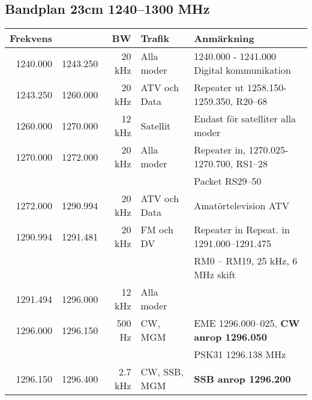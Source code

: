 \begin{landscape}
\subsection{Bandplan 23cm 1240--1300 MHz}
\begin{tabular}{rrrll}
	\textbf{Frekvens}         &               & \textbf{BW}   & \textbf{Trafik}     & \textbf{Anmärkning}                                          \\ \hline
	         1240.000         & 1243.250      & 20 kHz        & Alla moder          & 1240.000 - 1241.000 Digital kommunikation                    \\ \hline
	         1243.250         & 1260.000      & 20 kHz        & ATV och Data        & Repeater ut 1258.150-1259.350, R20--68                       \\ \hline
	         1260.000         & 1270.000      & 12 kHz        & Satellit            & Endast för satelliter alla moder                             \\ \hline
	         1270.000         & 1272.000      & 20 kHz        & Alla moder          & Repeater in, 1270.025-1270.700, RS1--28                      \\
                                  &               &               &                     & Packet RS29--50                                              \\ \hline
	         1272.000         & 1290.994      & 20 kHz        & ATV och Data        & Amatörtelevision ATV                                         \\ \hline
	         1290.994         & 1291.481      & 20 kHz        & FM och DV           & Repeater in Repeat. in 1291.000--1291.475                    \\
                                  &               &               &                     & RM0 – RM19, 25 kHz, 6 MHz skift                              \\ \hline
	         1291.494         & 1296.000      & 12 kHz        & Alla moder          &                                                              \\ \hline
	         1296.000         & 1296.150      & 500 Hz        & CW,  MGM            & EME 1296.000--025, \textbf{CW anrop 1296.050}                \\
                                  &               &               &                     & PSK31 1296.138 MHz                                           \\ \hline
	         1296.150         & 1296.400      & 2.7 kHz       & CW, SSB, MGM        & \textbf{SSB anrop 1296.200}                                  \\

\end{tabular}
\end{landscape}
